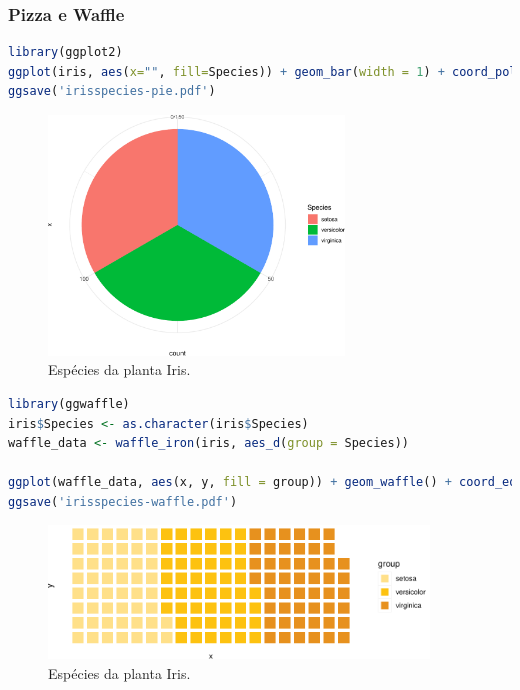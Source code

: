 \begin{frame}
\frametitle{Pizza e Waffle}

\begin{lstlisting}[language=R, label=lst-irisspecies-pie, caption={Gráfico pizza.}, postbreak=\mbox{$\hookrightarrow$\space}, basicstyle=\fontsize{8}{10}\selectfont\ttfamily]
library(ggplot2)
ggplot(iris, aes(x="", fill=Species)) + geom_bar(width = 1) + coord_polar("y") + theme_minimal()
ggsave('irisspecies-pie.pdf')
\end{lstlisting}

\framebreak

\begin{figure}[h]
 \centering
 \includegraphics[width=0.7\textwidth,height=0.7\textheight,keepaspectratio]{figures/irisspecies-pie.pdf}
 \caption{Espécies da planta Iris.}
 \label{fig-irisspecies-pie}
\end{figure}

\framebreak

\begin{lstlisting}[language=R, label=lst-irisspecies-waffle, caption={Gráfico Waffle.}, postbreak=\mbox{$\hookrightarrow$\space}, basicstyle=\fontsize{8}{10}\selectfont\ttfamily]
library(ggwaffle)
iris$Species <- as.character(iris$Species)
waffle_data <- waffle_iron(iris, aes_d(group = Species))

ggplot(waffle_data, aes(x, y, fill = group)) + geom_waffle() + coord_equal() + scale_fill_waffle() + theme_waffle()
ggsave('irisspecies-waffle.pdf')
\end{lstlisting}

\framebreak

\begin{figure}[h]
 \centering
 \includegraphics[width=0.9\textwidth,height=0.7\textheight,keepaspectratio]{figures/irisspecies-waffle.pdf}
 \caption{Espécies da planta Iris.}
 \label{fig-irisspecies-waffle}
\end{figure}

\end{frame}




